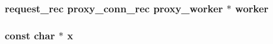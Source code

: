 \subsubsection[{\texorpdfstring{worker}{worker}}]{ {\bf request\+\_\+rec} {\bf proxy\+\_\+conn\+\_\+rec} {\bf proxy\+\_\+worker} $\ast$ worker}\hypertarget{group__MOD__PROXY_gad62a732febc2b789c7a84e2fdb3c5aa8}{}\label{group__MOD__PROXY_gad62a732febc2b789c7a84e2fdb3c5aa8}
\subsubsection[{\texorpdfstring{x}{x}}]{\setlength{\rightskip}{0pt plus 5cm}const char $\ast$ x}\hypertarget{group__MOD__PROXY_gaa51afdb6d96b938b938dc9439be201be}{}\label{group__MOD__PROXY_gaa51afdb6d96b938b938dc9439be201be}
